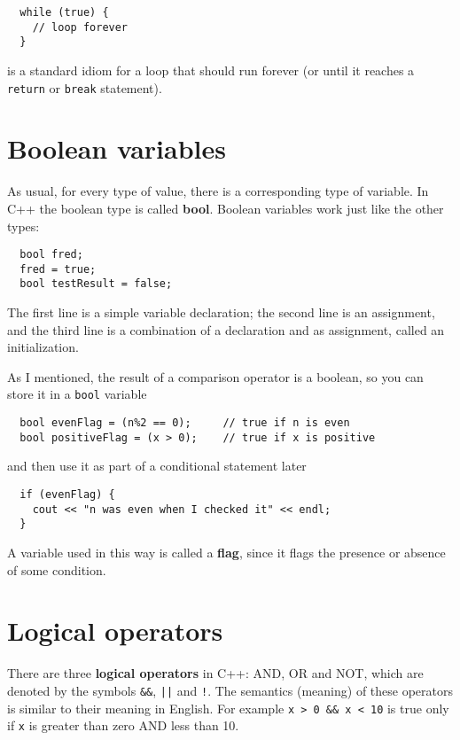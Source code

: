 \begin{verbatim}
  while (true) {
    // loop forever
  }
\end{verbatim}
%
is a standard idiom for a loop that should run forever (or
until it reaches a {\tt return} or {\tt break} statement).

\section{Boolean variables}

As usual, for every type of value, there is a corresponding
type of variable.  In C++ the boolean type is called {\bf bool}.
Boolean variables work just like the other types:

\begin{verbatim}
  bool fred;
  fred = true;
  bool testResult = false;
\end{verbatim}
%
The first line is a simple variable declaration;
the second line is an assignment, and the third line is a
combination of a declaration and as assignment, 
called an initialization.


As I mentioned, the result of a comparison operator is a boolean,
so you can store it in a {\tt bool} variable

\begin{verbatim}
  bool evenFlag = (n%2 == 0);     // true if n is even
  bool positiveFlag = (x > 0);    // true if x is positive
\end{verbatim}
%
and then use it as part of a conditional statement later

\begin{verbatim}
  if (evenFlag) {
    cout << "n was even when I checked it" << endl;
  }
\end{verbatim}
%
A variable used in this way is called a {\bf flag},
since it flags the presence or absence of some condition.


\section{Logical operators}

There are three {\bf logical operators} in C++: AND, OR and NOT,
which are denoted by the symbols {\tt \&\&}, {\tt ||} and
{\tt !}.  The semantics (meaning) of these operators is similar
to their meaning in English.  For example {\tt x > 0 \&\& x < 10}
is true only if {\tt x} is greater than zero AND less than 10.


